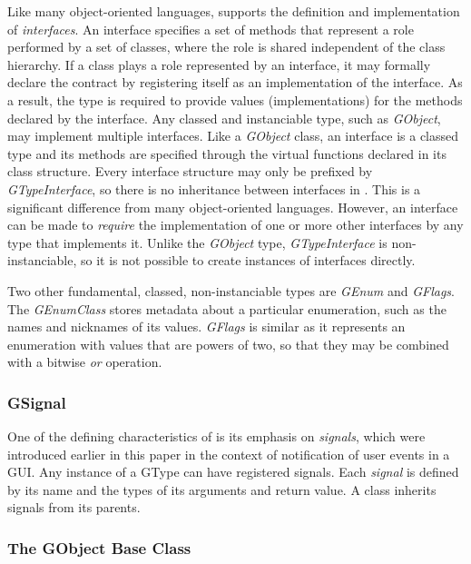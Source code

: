 \documentclass[article]{jss}
\begin{document}
Like many object-oriented languages,  supports the definition and implementation of \emph{interfaces}. An interface specifies a set of methods that represent a role performed by a set of classes, where the role is shared independent of the class hierarchy. If a class plays a role represented by an interface, it may formally declare the contract by registering itself as an implementation of the interface. As a result, the type is required to provide values (implementations) for the methods declared by the interface. Any classed and instanciable type, such as \emph{GObject}, may implement multiple interfaces. Like a \emph{GObject} class, an interface is a classed type and its methods are specified through the virtual functions declared in its class structure. Every interface structure may only be prefixed by \emph{GTypeInterface}, so there is no inheritance between interfaces in . This is a significant difference from many object-oriented languages. However, an interface can be made to \emph{require} the implementation of one or more other interfaces by any type that implements it. Unlike the \emph{GObject} type, \emph{GTypeInterface} is non-instanciable, so it is not possible to create instances of interfaces directly.

Two other fundamental, classed, non-instanciable types are
\emph{GEnum} and 
\emph{GFlags}. The \emph{GEnumClass} stores metadata about a
particular
enumeration, such as the names and nicknames of its values.
\emph{GFlags} is
similar as it represents an enumeration with values that are powers of
two, 
so that they may be combined with a bitwise \emph{or} operation.

\subsubsection{GSignal}

One of the defining characteristics of  is its emphasis
on
\emph{signals}, which were introduced earlier in this paper in the
context of
notification of user events in a  GUI. Any instance of a
GType can 
have registered signals. Each \emph{signal} is defined by its name and
the types
of its arguments and return value. A class inherits signals from its
parents.

\subsubsection{The GObject Base Class}
\end{document}
